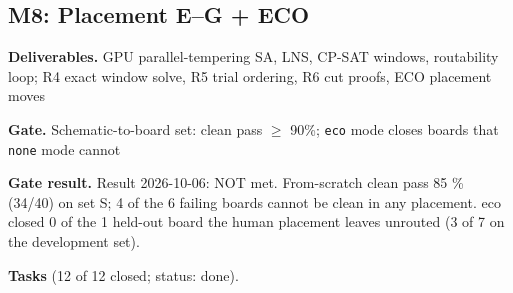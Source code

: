 \subsection*{M8: Placement E--G + ECO}
\noindent\textbf{Deliverables.} GPU parallel-tempering SA, LNS, CP-SAT windows, routability loop; R4 exact window solve, R5 trial ordering, R6 cut proofs, ECO placement moves\par\smallskip
\noindent\textbf{Gate.} Schematic-to-board set: clean pass $\geq$ 90\%; \texttt{eco} mode closes boards that \texttt{none} mode cannot\par\smallskip
\noindent\colorbox{boxfill}{\parbox{\dimexpr\linewidth-2\fboxsep}{\textbf{Gate result.} Result 2026-10-06: NOT met. From-scratch clean pass 85 \% (34/40) on set S; 4 of the 6 failing boards cannot be clean in any placement. eco closed 0 of the 1 held-out board the human placement leaves unrouted (3 of 7 on the development set).}}\par\smallskip
\noindent\textbf{Tasks} (12 of 12 closed; status: done).
